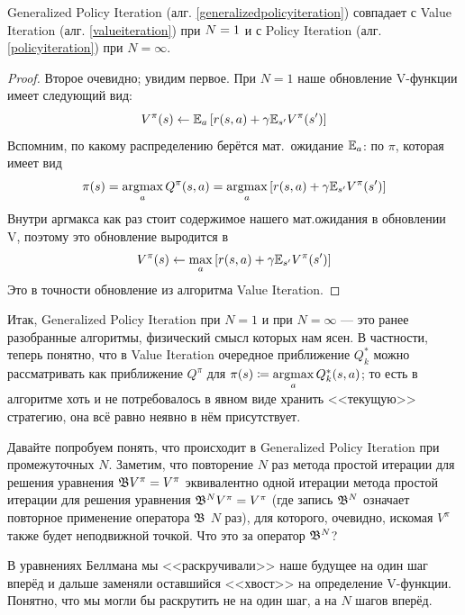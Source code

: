\begin{proposition}
Generalized Policy Iteration (алг. \ref{generalizedpolicyiteration}) совпадает с Value Iteration (алг. \ref{valueiteration}) при $N \HM= 1$ и с Policy Iteration (алг. \ref{policyiteration}) при $N = \infty$.
\begin{proof}
Второе очевидно; увидим первое. При $N = 1$ наше обновление V-функции имеет следующий вид:
$$V^{\pi}(s) \leftarrow \mathbb{E}_{a} \left[ r(s, a) + \gamma \mathbb{E}_{s'} V^{\pi}(s') \right]$$
Вспомним, по какому распределению берётся мат.~ожидание $\mathbb{E}_a$: по $\pi$, которая имеет вид 
$$\pi(s) = \mathop{\mathrm{argmax}}\limits_a Q^{\pi}(s, a) = \mathop{\mathrm{argmax}}\limits_a \left[ r(s, a) + \gamma \mathbb{E}_{s'} V^{\pi}(s') \right]$$
Внутри аргмакса как раз стоит содержимое нашего мат.ожидания в обновлении V, поэтому это обновление выродится в
$$V^{\pi}(s) \leftarrow \max\limits_{a} \left[ r(s, a) + \gamma \mathbb{E}_{s'} V^{\pi}(s') \right]$$
Это в точности обновление из алгоритма Value Iteration.
\end{proof}
\end{proposition}

Итак, Generalized Policy Iteration при $N = 1$ и при $N = \infty$ --- это ранее разобранные алгоритмы, физический смысл которых нам ясен. В частности, теперь понятно, что в Value Iteration очередное приближение $Q^*_k$ можно рассматривать как приближение $Q^{\pi}$ для $\pi(s) \HM \coloneqq \argmax\limits_{a} Q^*_k(s, a)$; то есть в алгоритме хоть и не потребовалось в явном виде хранить <<текущую>> стратегию, она всё равно неявно в нём присутствует. 

Давайте попробуем понять, что происходит в Generalized Policy Iteration при промежуточных $N$. Заметим, что повторение $N$ раз метода простой итерации для решения уравнения $\B V^\pi \HM= V^\pi$ эквивалентно одной итерации метода простой итерации для решения уравнения $\B^N V^\pi \HM= V^\pi$ (где запись $\mathfrak{B}^N$ означает повторное применение оператора $\mathfrak{B}$ $N$ раз), для которого, очевидно, искомая $V^{\pi}$ также будет неподвижной точкой. Что это за оператор $\mathfrak{B}^N$? 

В уравнениях Беллмана мы <<раскручивали>> наше будущее на один шаг вперёд и дальше заменяли оставшийся <<хвост>> на определение V-функции. Понятно, что мы могли бы раскрутить не на один шаг, а на $N$ шагов вперёд.

